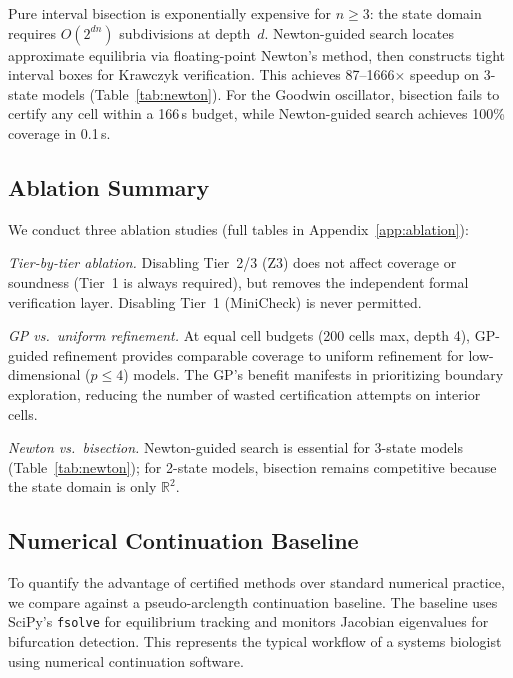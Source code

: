 \documentclass[11pt]{article}
\newcommand{\R}{\mathbb{R}}
\begin{document}
Pure interval bisection is exponentially expensive for $n \geq 3$: the state domain requires $O(2^{dn})$ subdivisions at depth~$d$.
Newton-guided search locates approximate equilibria via floating-point Newton's method, then constructs tight interval boxes for Krawczyk verification.
This achieves 87--1666$\times$ speedup on 3-state models (Table~\ref{tab:newton}).
For the Goodwin oscillator, bisection fails to certify any cell within a 166\,s budget, while Newton-guided search achieves 100\% coverage in 0.1\,s.

\subsection{Ablation Summary}

We conduct three ablation studies (full tables in Appendix~\ref{app:ablation}):

\emph{Tier-by-tier ablation.} Disabling Tier~2/3 (Z3) does not affect coverage or soundness (Tier~1 is always required), but removes the independent formal verification layer.  Disabling Tier~1 (MiniCheck) is never permitted.

\emph{GP vs.\ uniform refinement.} At equal cell budgets (200 cells max, depth 4), GP-guided refinement provides comparable coverage to uniform refinement for low-dimensional ($p \leq 4$) models.  The GP's benefit manifests in prioritizing boundary exploration, reducing the number of wasted certification attempts on interior cells.

\emph{Newton vs.\ bisection.} Newton-guided search is essential for 3-state models (Table~\ref{tab:newton}); for 2-state models, bisection remains competitive because the state domain is only $\R^2$.

\subsection{Numerical Continuation Baseline}
\label{sec:baseline}

To quantify the advantage of certified methods over standard numerical practice, we compare against a pseudo-arclength continuation baseline.
The baseline uses SciPy's \texttt{fsolve} for equilibrium tracking and monitors Jacobian eigenvalues for bifurcation detection.
This represents the typical workflow of a systems biologist using numerical continuation software.
\end{document}
